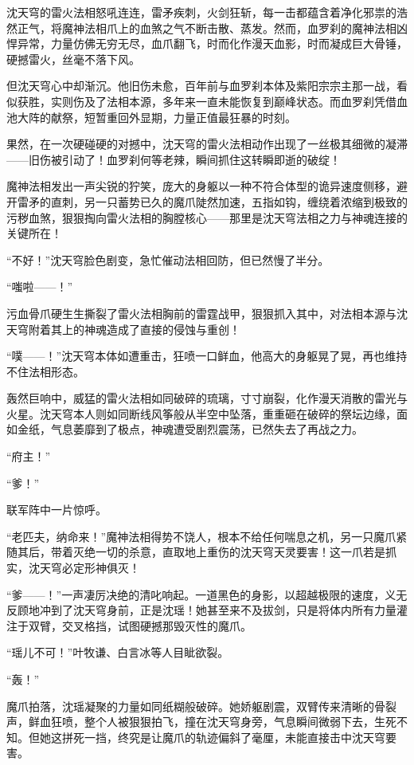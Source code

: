 沈天穹的雷火法相怒吼连连，雷矛疾刺，火剑狂斩，每一击都蕴含着净化邪祟的浩然正气，将魔神法相爪上的血煞之气不断击散、蒸发。然而，血罗刹的魔神法相凶悍异常，力量仿佛无穷无尽，血爪翻飞，时而化作漫天血影，时而凝成巨大骨锤，硬撼雷火，丝毫不落下风。

但沈天穹心中却渐沉。他旧伤未愈，百年前与血罗刹本体及紫阳宗宗主那一战，看似获胜，实则伤及了法相本源，多年来一直未能恢复到巅峰状态。而血罗刹凭借血池大阵的献祭，短暂重回外显期，力量正值最狂暴的时刻。

果然，在一次硬碰硬的对撼中，沈天穹的雷火法相动作出现了一丝极其细微的凝滞——旧伤被引动了！血罗刹何等老辣，瞬间抓住这转瞬即逝的破绽！

魔神法相发出一声尖锐的狞笑，庞大的身躯以一种不符合体型的诡异速度侧移，避开雷矛的直刺，另一只蓄势已久的魔爪陡然加速，五指如钩，缠绕着浓缩到极致的污秽血煞，狠狠掏向雷火法相的胸膛核心——那里是沈天穹法相之力与神魂连接的关键所在！

“不好！”沈天穹脸色剧变，急忙催动法相回防，但已然慢了半分。

“嗤啦——！”

污血骨爪硬生生撕裂了雷火法相胸前的雷霆战甲，狠狠抓入其中，对法相本源与沈天穹附着其上的神魂造成了直接的侵蚀与重创！

“噗——！”沈天穹本体如遭重击，狂喷一口鲜血，他高大的身躯晃了晃，再也维持不住法相形态。

轰然巨响中，威猛的雷火法相如同破碎的琉璃，寸寸崩裂，化作漫天消散的雷光与火星。沈天穹本人则如同断线风筝般从半空中坠落，重重砸在破碎的祭坛边缘，面如金纸，气息萎靡到了极点，神魂遭受剧烈震荡，已然失去了再战之力。

“府主！”

“爹！”

联军阵中一片惊呼。

“老匹夫，纳命来！”魔神法相得势不饶人，根本不给任何喘息之机，另一只魔爪紧随其后，带着灭绝一切的杀意，直取地上重伤的沈天穹天灵要害！这一爪若是抓实，沈天穹必定形神俱灭！

“爹——！”一声凄厉决绝的清叱响起。一道黑色的身影，以超越极限的速度，义无反顾地冲到了沈天穹身前，正是沈瑶！她甚至来不及拔剑，只是将体内所有力量灌注于双臂，交叉格挡，试图硬撼那毁灭性的魔爪。

“瑶儿不可！”叶牧谦、白言冰等人目眦欲裂。

“轰！”

魔爪拍落，沈瑶凝聚的力量如同纸糊般破碎。她娇躯剧震，双臂传来清晰的骨裂声，鲜血狂喷，整个人被狠狠拍飞，撞在沈天穹身旁，气息瞬间微弱下去，生死不知。但她这拼死一挡，终究是让魔爪的轨迹偏斜了毫厘，未能直接击中沈天穹要害。

